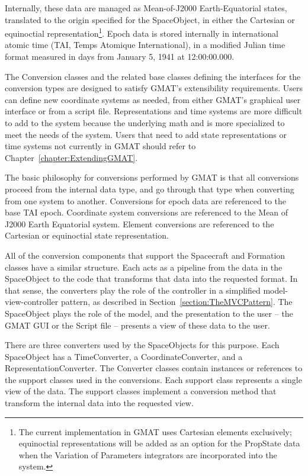 Internally, these data are managed as Mean-of-J2000 Earth-Equatorial states, translated to the
origin specified for the SpaceObject, in either the Cartesian or equinoctial
representation\footnote{The current implementation in GMAT uses Cartesian elements exclusively;
equinoctial representations will be added as an option for the PropState data when the Variation of
Parameters integrators are incorporated into the system.}.  Epoch data is stored internally in
international atomic time (TAI, Temps Atomique International), in a modified Julian time format
measured in days from January 5, 1941 at 12:00:00.000.

The Conversion classes and the related base classes defining the interfaces for the conversion types
are designed to satisfy GMAT's extensibility requirements.  Users can define new coordinate systems
as needed, from either GMAT's graphical user interface or from a script file.  Representations and
time systems are more difficult to add to the system because the underlying math and is more
specialized to meet the needs of the system.  Users that need to add state representations or
time systems not currently in GMAT should refer to Chapter~\ref{chapter:ExtendingGMAT}.

The basic philosophy for conversions performed by GMAT is that all conversions proceed from the
internal data type, and go through that type when converting from one system to another.
Conversions for epoch data are referenced to the base TAI epoch.  Coordinate system conversions are
referenced to the Mean of J2000 Earth Equatorial system.  Element conversions are referenced to the
Cartesian or equinoctial state representation.

All of the conversion components that support the Spacecraft and Formation classes have a similar
structure.  Each acts as a pipeline from the data in the SpaceObject to the code that transforms
that data into the requested format.  In that sense, the converters play the role of the controller
in a simplified model-view-controller pattern, as described in Section~\ref{section:TheMVCPattern}.
 The SpaceObject plays the role of the model, and the presentation to the user -- the GMAT GUI or
the Script file -- presents a view of these data to the user.

There are three converters used by the SpaceObjects for this purpose.  Each SpaceObject has a
TimeConverter, a CoordinateConverter, and a RepresentationConverter.  The Converter classes contain
instances or references to the support classes used in the conversions.  Each support class
represents a single view of the data.  The support classes implement a conversion method that
transform the internal data into the requested view.

